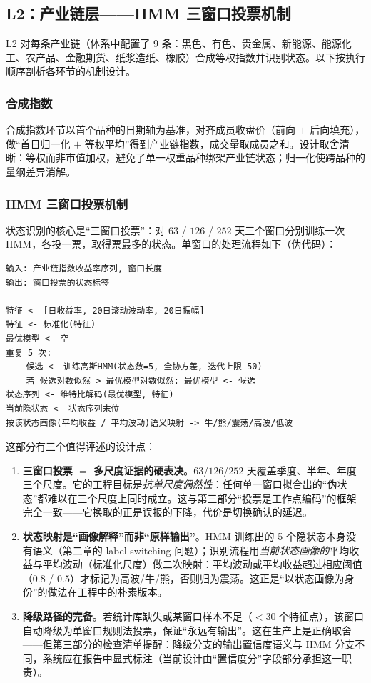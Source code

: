 \subsection{L2：产业链层——HMM 三窗口投票机制}

L2 对每条产业链（体系中配置了 9 条：黑色、有色、贵金属、新能源、能源化工、农产品、金融期货、纸浆造纸、橡胶）合成等权指数并识别状态。以下按执行顺序剖析各环节的机制设计。

\subsubsection{合成指数}

合成指数环节以首个品种的日期轴为基准，对齐成员收盘价（前向 $+$ 后向填充），做“首日归一化 $+$ 等权平均”得到产业链指数，成交量取成员之和。设计取舍清晰：等权而非市值加权，避免了单一权重品种绑架产业链状态；归一化使跨品种的量纲差异消解。

\subsubsection{HMM 三窗口投票机制}

状态识别的核心是“三窗口投票”：对 $63$ / $126$ / $252$ 天三个窗口分别训练一次 HMM，各投一票，取得票最多的状态。单窗口的处理流程如下（伪代码）：

\begin{lstlisting}[language={}, caption={单窗口 HMM 识别流程（伪代码）}]
输入: 产业链指数收益率序列, 窗口长度
输出: 窗口投票的状态标签

特征 <- [日收益率, 20日滚动波动率, 20日振幅]
特征 <- 标准化(特征)
最优模型 <- 空
重复 5 次:
    候选 <- 训练高斯HMM(状态数=5, 全协方差, 迭代上限 50)
    若 候选对数似然 > 最优模型对数似然: 最优模型 <- 候选
状态序列 <- 维特比解码(最优模型, 特征)
当前隐状态 <- 状态序列末位
按该状态画像(平均收益 / 平均波动)语义映射 -> 牛/熊/震荡/高波/低波
\end{lstlisting}

这部分有三个值得评述的设计点：

\begin{enumerate}[itemsep=3pt]
\item \textbf{三窗口投票 $=$ 多尺度证据的硬表决}。$63$/$126$/$252$ 天覆盖季度、半年、年度三个尺度。它的工程目标是\emph{抗单尺度偶然性}：任何单一窗口拟合出的“伪状态”都难以在三个尺度上同时成立。这与第三部分“投票是工作点编码”的框架完全一致——它换取的正是误报的下降，代价是切换确认的延迟。
\item \textbf{状态映射是“画像解释”而非“原样输出”}。HMM 训练出的 5 个隐状态本身没有语义（第二章的 label switching 问题）；识别流程用\emph{当前状态画像的}平均收益与平均波动（标准化尺度）做二次映射：平均波动或平均收益超过相应阈值（$0.8$ / $0.5$）才标记为高波/牛/熊，否则归为震荡。这正是“以状态画像为身份”的做法在工程中的朴素版本。
\item \textbf{降级路径的完备}。若统计库缺失或某窗口样本不足（$< 30$ 个特征点），该窗口自动降级为单窗口规则法投票，保证“永远有输出”。这在生产上是正确取舍——但第三部分的检查清单提醒：降级分支的输出置信度语义与 HMM 分支不同，系统应在报告中显式标注（当前设计由“置信度分”字段部分承担这一职责）。
\end{enumerate}


